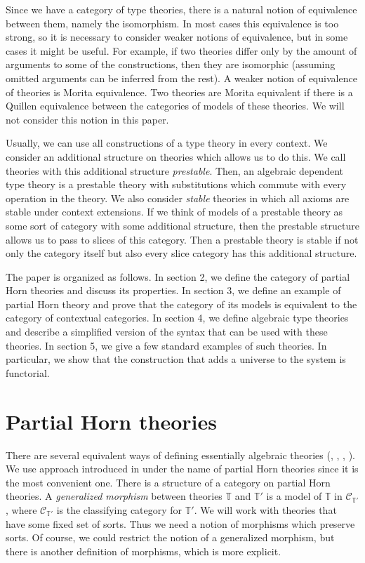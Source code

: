 \documentclass[reqno]{amsart}
\theoremstyle{definition}
\theoremstyle{remark}
\numberwithin{figure}{section}
\begin{document}
Since we have a category of type theories, there is a natural notion of equivalence between them, namely the isomorphism.
In most cases this equivalence is too strong, so it is necessary to consider weaker notions of equivalence, but in some cases it might be useful.
For example, if two theories differ only by the amount of arguments to some of the constructions,
then they are isomorphic (assuming omitted arguments can be inferred from the rest).
A weaker notion of equivalence of theories is Morita equivalence.
Two theories are Morita equivalent if there is a Quillen equivalence between the categories of models of these theories.
We will not consider this notion in this paper.

Usually, we can use all constructions of a type theory in every context.
We consider an additional structure on theories which allows us to do this.
We call theories with this additional structure \emph{prestable}.
Then, an algebraic dependent type theory is a prestable theory with substitutions which commute with every operation in the theory.
We also consider \emph{stable} theories in which all axioms are stable under context extensions.
If we think of models of a prestable theory as some sort of category with some additional structure,
then the prestable structure allows us to pass to slices of this category.
Then a prestable theory is stable if not only the category itself but also every slice category has this additional structure.

The paper is organized as follows.
In section 2, we define the category of partial Horn theories and discuss its properties.
In section 3, we define an example of partial Horn theory and prove that the category of its models is equivalent to the category of contextual categories.
In section 4, we define algebraic type theories and describe a simplified version of the syntax that can be used with these theories.
In section 5, we give a few standard examples of such theories. In particular, we show that the construction that adds a universe to the system is functorial.

\section{Partial Horn theories}
\label{sec:PHT}

There are several equivalent ways of defining essentially algebraic theories (\cite{LPC}, \cite{GAT}, \cite{PHL}, \cite[D 1.3.4]{elephant}).
We use approach introduced in \cite{PHL} under the name of partial Horn theories since it is the most convenient one.
There is a structure of a category on partial Horn theories.
A \emph{generalized morphism} between theories $\mathbb{T}$ and $\mathbb{T}'$ is a model of $\mathbb{T}$ in $\mathcal{C}_{\mathbb{T}'}$,
where $\mathcal{C}_{\mathbb{T}'}$ is the classifying category for $\mathbb{T}'$.
We will work with theories that have some fixed set of sorts.
Thus we need a notion of morphisms which preserve sorts.
Of course, we could restrict the notion of a generalized morphism, but there is another definition of morphisms, which is more explicit.
\end{document}
